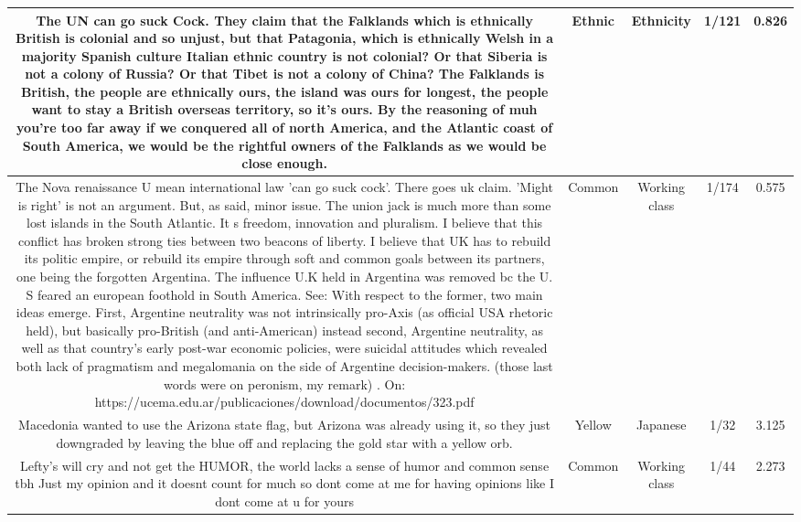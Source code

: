 \documentclass[11pt]{article}
\newlength\mylength
\begin{document}
\begin{center}
\begin{longtable}{|C{.40\mylength}|C{.30\mylength}|C{.15\mylength}|C{.15\mylength}|C{.15\mylength}|}
  The UN can go suck Cock. They claim that the Falklands which is ethnically British is colonial and so unjust, but that Patagonia, which is ethnically Welsh in a majority Spanish culture Italian ethnic country is not colonial? Or that Siberia is not a colony of Russia? Or that Tibet is not a colony of China? The Falklands is British, the people are ethnically ours, the island was ours for longest, the people want to stay a British overseas territory, so it's ours. By the reasoning of  muh you're too far away  if we conquered all of north America, and the Atlantic coast of South America, we would be the rightful owners of the Falklands as we would be close enough.  & Ethnic & Ethnicity & 1/121 & 0.826 \\  \hline
    The Nova renaissance U mean international law 'can go suck cock'. There goes uk claim. 'Might is right'  is not an argument. But, as said, minor issue.   The union jack is much more than some lost islands in the South Atlantic. It s freedom, innovation and pluralism.  I believe that this conflict has broken strong ties between two beacons of liberty.    I believe that UK has to rebuild its politic empire, or rebuild its empire through soft and common goals between its partners, one being the forgotten Argentina. The influence U.K held in Argentina was removed bc the U. S feared an european foothold in South America.  See:  With respect to the former,  two main ideas emerge. First, Argentine neutrality was not intrinsically pro-Axis (as official USA rhetoric held), but basically pro-British (and anti-American) instead  second, Argentine neutrality, as well as that country's early post-war economic policies, were suicidal attitudes which revealed both lack of  pragmatism and megalomania on the side of Argentine decision-makers.  (those last words were on peronism, my remark) . On: https://ucema.edu.ar/publicaciones/download/documentos/323.pdf  & Common & Working class & 1/174 & 0.575 \\  \hline
  Macedonia wanted to use the Arizona state flag, but Arizona was already using it, so they just downgraded by leaving the blue off and replacing the gold star with a yellow orb.  & Yellow & Japanese & 1/32 & 3.125 \\  \hline
  Lefty's will cry and not get the HUMOR, the world lacks a sense of humor and common sense tbh Just my opinion and it doesnt count for much so dont come at me for having opinions like I dont come at u for yours  & Common & Working class & 1/44 & 2.273 \\  \hline

\end{longtable}
\end{center}
\end{document}
